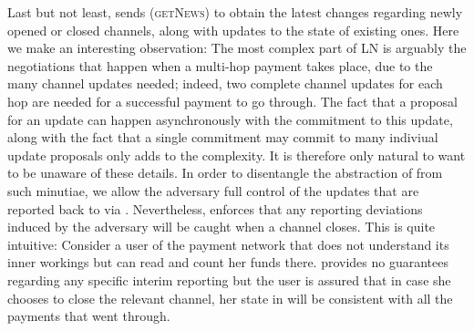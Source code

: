   Last but not least, \environment{} sends (\textsc{getNews}) to obtain the
  latest changes regarding newly opened or closed channels, along with updates
  to the state of existing ones. Here we make an interesting observation: The
  most complex part of LN is arguably the negotiations that happen when a
  multi-hop payment takes place, due to the many channel updates needed; indeed,
  two complete channel updates for each hop are needed for a successful payment
  to go through. The fact that a proposal for an update can happen
  asynchronously with the commitment to this update, along with the fact that a
  single commitment may commit to many indiviual update proposals only adds to
  the complexity. It is therefore only natural to want \fpaynet{} to be unaware
  of these details. In order to disentangle the abstraction of \fpaynet{} from
  such minutiae, we allow the adversary full control of the
  updates that are reported back
  to \environment{} via  \fpaynet{}. 
  Nevertheless, \fpaynet{} enforces that 
  any   reporting deviations induced by the adversary will 
   be caught  when a channel
  closes.  This is quite intuitive: Consider
  a user of the payment network that does not understand its inner workings but
  can read \ledger{} and count her funds there. \fpaynet{} provides no guarantees 
  regarding any specific interim reporting but the user is assured that   in case she chooses to close  the relevant channel,  her state in
  \ledger{} will be consistent with all the payments that went through.
